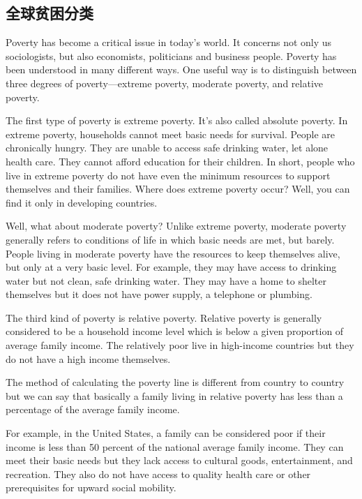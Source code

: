 \subsection{全球贫困分类}
Poverty has become a critical issue in today's world. It concerns not only us sociologists, but also economists, politicians and business people. Poverty has been understood in many different ways. One useful way is to distinguish between three degrees of poverty—extreme poverty, moderate poverty, and relative poverty.

The first type of poverty is extreme poverty. It's also called absolute poverty. In extreme poverty, households cannot meet basic needs for survival. People are chronically hungry. They are unable to access safe drinking water, let alone health care. They cannot afford education for their children. In short, people who live in extreme poverty do not have even the minimum resources to support themselves and their families. Where does extreme poverty occur? Well, you can find it only in developing countries.

Well, what about moderate poverty? Unlike extreme poverty, moderate poverty generally refers to conditions of life in which basic needs are met, but barely. People living in moderate poverty have the resources to keep themselves alive, but only at a very basic level. For example, they may have access to drinking water but not clean, safe drinking water. They may have a home to shelter themselves but it does not have power supply, a telephone or plumbing.

The third kind of poverty is relative poverty. Relative poverty is generally considered to be a household income level which is below a given proportion of average family income. The relatively poor live in high-income countries but they do not have a high income themselves.

The method of calculating the poverty line is different from country to country but we can say that basically a family living in relative poverty has less than a percentage of the average family income.

For example, in the United States, a family can be considered poor if their income is less than 50 percent of the national average family income. They can meet their basic needs but they lack access to cultural goods, entertainment, and recreation. They also do not have access to quality health care or other prerequisites for upward social mobility.


